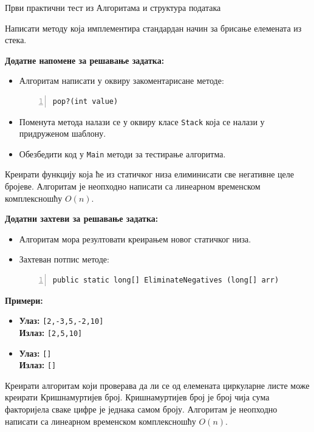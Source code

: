 
Први практични тест из Алгоритама и структура података

Написати методу која имплементира стандардан начин за брисање елемената из стека.

\textbf{Додатне напомене за решавање задатка:}
\begin{itemize}
    \item Алгоритам написати у оквиру закоментарисане методе:
    \begin{Verbatim}[fontsize=\footnotesize, numbers=left, xleftmargin=10mm]
pop?(int value)
    \end{Verbatim}
    \item Поменута метода налази се у оквиру класе \texttt{Stack} која се налази у придруженом шаблону.
    \item Обезбедити код у \texttt{Main} методи за тестирање алгоритма.
\end{itemize}



Креирати функцију која ће из статичког низа елиминисати све негативне целе бројеве. Алгоритам је неопходно написати са линеарном временском комплексношћу $O(n)$.

\textbf{Додатни захтеви за решавање задатка:}
\begin{itemize}
    \item Алгоритам мора резултовати креирањем новог статичког низа.
    \item Захтеван потпис методе:
    \begin{Verbatim}[fontsize=\footnotesize, numbers=left, xleftmargin=10mm]
public static long[] EliminateNegatives (long[] arr)
    \end{Verbatim}
\end{itemize}

\textbf{Примери:}
\begin{itemize}
    \item \textbf{Улаз:} \texttt{[2,-3,5,-2,10]} \\
          \textbf{Излаз:} \texttt{[2,5,10]}
    \item \textbf{Улаз:} \texttt{[]} \\
          \textbf{Излаз:} \texttt{[]}
\end{itemize}



Креирати алгоритам који проверава да ли се од елемената циркуларне листе може креирати Кришнамуртијев број. Кришнамуртијев број је број чија сума факторијела сваке цифре је једнака самом броју. Алгоритам је неопходно написати са линеарном временском комплексношћу $O(n)$.

